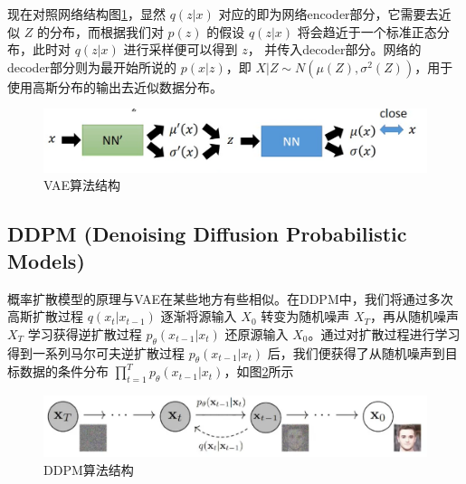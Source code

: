 \documentclass[12pt,a4paper,UTF8]{article}
\begin{document}
\indent 现在对照网络结构图\ref{vae2_img}，显然 $q\left(z|x\right)$ 对应的即为网络encoder部分，它需要去近似 $Z$ 的分布，而根据我们对 $p\left(z\right)$ 的假设 $q\left(z|x\right)$ 将会趋近于一个标准正态分布，此时对 $q\left(z|x\right)$ 进行采样便可以得到 $z$， 并传入decoder部分。网络的decoder部分则为最开始所说的 $p\left(x|z\right)$，即 $X|Z\sim N\left(\mu\left(Z\right),\sigma^2\left(Z\right)\right)$，用于使用高斯分布的输出去近似数据分布。

\begin{figure}[htb]\centering\includegraphics[scale=0.6]{./figure/5.png}\caption{VAE算法结构}\label{vae2_img}\end{figure}

\subsection{DDPM (Denoising Diffusion Probabilistic Models)}
\indent 概率扩散模型的原理与VAE在某些地方有些相似。在DDPM中，我们将通过多次高斯扩散过程 $q\left(x_t|x_{t-1}\right)$ 逐渐将源输入 $X_0$ 转变为随机噪声 $X_T$，再从随机噪声 $X_T$ 学习获得逆扩散过程 $p_\theta\left(x_{t-1}|x_t\right)$ 还原源输入 $X_0$。通过对扩散过程进行学习得到一系列马尔可夫逆扩散过程 $p_\theta\left(x_{t-1}|x_t\right)$ 后，我们便获得了从随机噪声到目标数据的条件分布 $\prod\limits_{t=1}^{T}p_\theta\left(x_{t-1}|x_t\right)$，如图\ref{ddpm_img}所示

\begin{figure}[htb]\centering\includegraphics[scale=0.6]{./figure/6.png}\caption{DDPM算法结构}\label{ddpm_img}\end{figure}
\end{document}
